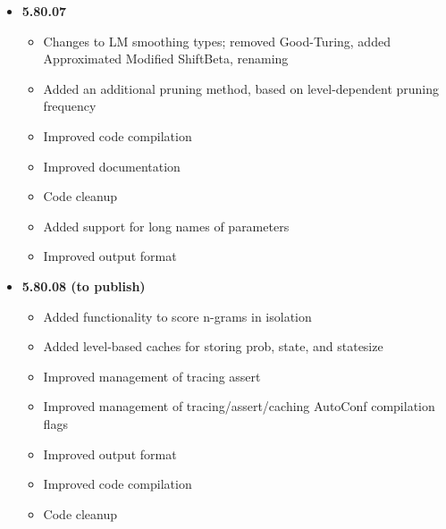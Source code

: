 \begin{itemize}
\begin{itemize}
\end{itemize}
\item {\bf 5.80.07}
\begin{itemize}
\item Changes to LM smoothing types; removed Good-Turing, added Approximated Modified ShiftBeta, renaming
\item Added an additional pruning method, based on level-dependent pruning frequency
\item Improved code compilation
\item Improved documentation
\item Code cleanup
\item Added support for long names of parameters
\item Improved output format 
\end{itemize}
\item {\bf 5.80.08 (to publish)}
\begin{itemize}
\item Added functionality to score n-grams in isolation
\item Added level-based caches for storing prob, state, and statesize
\item Improved management of tracing assert
\item Improved management of tracing/assert/caching AutoConf compilation flags
\item Improved output format
\item Improved code compilation
\item Code cleanup
\end{itemize}
\end{itemize}



